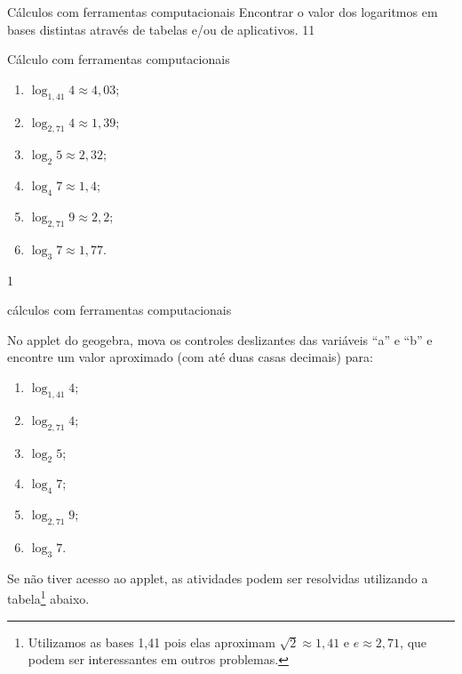 \clearpage

\begin{objectives}{Cálculos com ferramentas computacionais}
{
	Encontrar o valor dos logaritmos em bases distintas através de tabelas e/ou de aplicativos.
	}{1}{1}
\end{objectives}
\begin{answer}{Cálculo com ferramentas computacionais}
{
	\begin{enumerate}
	\item $\log_{1,41} 4 \approx 4,03$;
	\item $\log_{2,71} 4 \approx 1,39$;
	\item $\log_{2} 5 \approx 2,32$;
	\item $\log_{4} 7 \approx 1,4$;
	\item $\log_{2,71} 9 \approx 2,2$;
	\item $\log_{3} 7 \approx 1,77$.
	\end{enumerate}
}{1}
\end{answer}

\begin{task}{cálculos com ferramentas computacionais}

No applet do geogebra, mova os controles deslizantes das variáveis “a” e “b” e encontre um valor aproximado (com até duas casas decimais) para:
\begin{multicols}{2}
\begin{enumerate}
\item $\log_{1,41} 4$;
\item $\log_{2,71} 4$;
\item $\log_2 5$;
\item $\log_4 7$;
\item $\log_{2,71} 9$;
\item $\log_3 7$.
\end{enumerate}
\end{multicols}
\end{task}


Se não tiver acesso ao applet, as atividades podem ser resolvidas utilizando a tabela\footnote{Utilizamos as bases 1,41 pois elas aproximam $\sqrt{2} \approx 1,41$ e $e \approx 2,71$, que podem ser interessantes em outros problemas.} abaixo.


